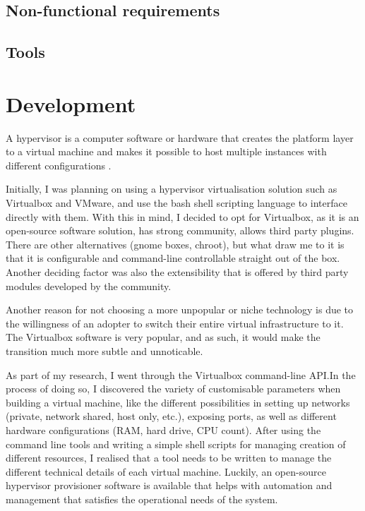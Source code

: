 \documentclass{article}
\let\oldcite=\cite
\renewcommand\cite[1]{\ifthenelse{\equal{#1}{_NEEDED_}}{[citation~needed]}{\oldcite{#1}}}
\begin{document}
  \subsection{Non-functional requirements}
  \subsection{Tools}

  \section{Development}
A hypervisor is a computer software or hardware that creates the platform layer to a virtual machine and makes it possible to host multiple instances with different configurations \cite{ibmvirtualisation}.

Initially, I was planning on using a hypervisor virtualisation solution such as Virtualbox and VMware, and use the \gls{bash} shell scripting language to interface directly with them. With this in mind, I decided to opt for Virtualbox, as it is an \gls{open-source} software solution, has strong community, allows third party plugins. There are other alternatives (gnome boxes, chroot), but what draw me to it is that it is configurable and command-line controllable straight out of the box. Another deciding factor was also the extensibility that is offered by third party modules developed by the community.

Another reason for not choosing a more unpopular or niche technology is due to the willingness of an adopter to switch their entire virtual infrastructure to it. The Virtualbox software is very popular, and as such, it would make the transition much more subtle and unnoticable. 

As part of my research, I went through the Virtualbox command-line API.In the process of doing so, I discovered the variety of customisable parameters when building a virtual machine, like the different possibilities in setting up networks (private, network shared, host only, etc.), exposing ports, as well as different hardware configurations (RAM, hard drive, CPU count). After using the command line tools and writing a simple shell scripts for managing creation of different resources, I realised that a tool needs to be written to manage the different technical details of each virtual machine. Luckily, an open-source hypervisor provisioner software is available that helps with automation and management that satisfies the operational needs of the system. 
\end{document}
